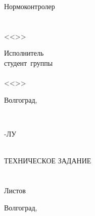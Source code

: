 {{\begin{flushleft}
\begin{minipage}[c]{15em}
Нормоконтролер\\
\VSTUStandardsAdviserDegree\\
\makebox[2cm]{\hrulefill}\VSTUStandardsAdviserName\\
<<\makebox[1.5cm]{\hrulefill}>>\makebox[3.5cm]{\hrulefill}\the\year
\end{minipage}
\hspace{\fill}
\begin{minipage}[c]{15em}
Исполнитель\\
студент\ группы\ \VSTUStudentGroup\\
\makebox[2cm]{\hrulefill}\VSTUStudentName\\
<<\makebox[1.5cm]{\hrulefill}>>\makebox[3.5cm]{\hrulefill}\the\year
\end{minipage}
\end{flushleft}
\vspace{\fill}
\begin{center}
Волгоград,\ \the\year
\end{center}
\newpage
\clearpage
\setcounter{page}{1}
\thispagestyle{empty}
\\
\par{\small \VSTULUCode-ЛУ\\}
\vspace{\fill}
\begin{center}
\VSTUTitle\\
\vspace{8mm}
ТЕХНИЧЕСКОЕ ЗАДАНИЕ\\
\VSTUDocumentCode{}\\
\VSTULUCode\\
Листов \totalpages\\
\end{center}
\vspace{\fill}
\begin{center}
Волгоград,\ \the\year
\end{center}
\newpage
}
}
